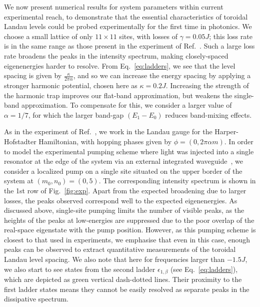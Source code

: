 \documentclass[twocolumn, 10pt, aps, superscriptaddress, floatfix, showpacs, pra, citeautoscript]{revtex4-1}
\begin{document}
We now present numerical results for system parameters within current experimental reach, to demonstrate that the essential characteristics of toroidal Landau levels could be probed experimentally for the first time in photonics. We choose a small
lattice of only $11 \times 11$ sites, with losses of $\gamma = 0.05 J$; this loss rate is in the same range as those present in the experiment of
Ref.~. Such a large loss rate broadens the
peaks in the intensity spectrum, making closely-spaced eigenenergies harder to resolve. From
Eq.~\eqref{eq:ladders}, we see that the level spacing is given by
$\frac{\kappa}{2\pi\alpha}$, and so we can increase the energy spacing by applying a stronger harmonic potential, chosen here as $\kappa = 0.2 J$. Increasing the strength of the harmonic trap improves our flat-band approximation, but weakens the single-band approximation. To compensate for this, we consider a larger value of $\alpha = 1/7$, for which the larger band-gap $(E_1 - E_0)$ reduces band-mixing effects. 

As in the experiment of Ref.~, we work in the Landau gauge for the Harper-Hofstadter Hamiltonian, with hopping phases given by $\phi = (0, 2\pi\alpha m)$. In order to model the experimental pumping scheme where light was injected into a single resonator at the edge of the system via an external integrated waveguide~\cite{hafezi2013imaging}, we consider a localized pump on a single site situated on the upper border of the system at $(m_0,n_0)= (0,5)$. 
The corresponding intensity spectrum is shown in the 1st row of Fig.~\ref{fig:exp}. Apart from the expected
broadening due to larger losses, the peaks observed correspond well to the expected eigenenergies. 
As discussed above, single-site pumping limits the number of visible peaks, as the heights of the peaks at low-energies are suppressed due to the poor overlap of the real-space eigenstate with the pump position. However, as this pumping scheme is closest to that used in experiments, we emphasise that even in this case, enough peaks can be observed to extract quantitative measurements of the toroidal Landau level spacing. We also note that here for frequencies larger
than $-1.5 J$, we also start to see states from the second ladder
$\epsilon_{1,\beta}$ (see Eq.~\eqref{eq:ladders}), which are depicted as green
vertical dash-dotted lines. Their proximity to the first ladder states
means they cannot be easily resolved as separate peaks in the dissipative
spectrum.
\end{document}
